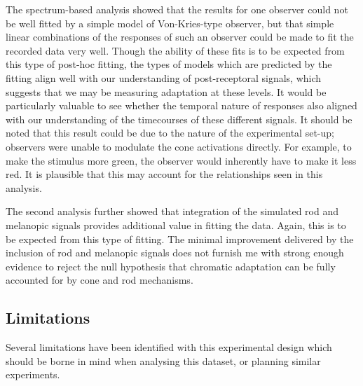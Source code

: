 The spectrum-based analysis showed that the results for one observer could not be well fitted by a simple model of Von-Kries-type observer, but that simple linear combinations of the responses of such an observer could be made to fit the recorded data very well. Though the ability of these fits is to be expected from this type of post-hoc fitting, the types of models which are predicted by the fitting align well with our understanding of post-receptoral signals, which suggests that we may be measuring adaptation at these levels. It would be particularly valuable to see whether the temporal nature of responses also aligned with our understanding of the timecourses of these different signals. It should be noted that this result could be due to the nature of the experimental set-up; observers were unable to modulate the cone activations directly. For example, to make the stimulus more green, the observer would inherently have to make it less red. It is plausible that this may account for the relationships seen in this analysis.

The second analysis further showed that integration of the simulated rod and melanopic signals provides additional value in fitting the data. Again, this is to be expected from this type of fitting. The minimal improvement delivered by the inclusion of rod and melanopic signals does not furnish me with strong enough evidence to reject the null hypothesis that chromatic adaptation can be fully accounted for by cone and rod mechanisms. 

\subsection{Limitations}

Several limitations have been identified with this experimental design which should be borne in mind when analysing this dataset, or planning similar experiments.

